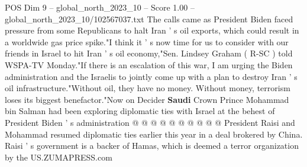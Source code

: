 \begin{textsample}{POS Dim 9 – global\_north\_2023\_10 – Score 1.00 – global\_north\_2023\_10/102567037.txt}
The calls came as President Biden faced pressure from some Republicans to halt Iran ' s oil exports, which could result in a worldwide gas price spike."I think it ' s now time for us to consider with our friends in Israel to hit Iran ' s oil economy,"Sen.
Lindsey Graham ( R-SC ) told WSPA-TV Monday."If there is an escalation of this war, I am urging the Biden administration and the Israelis to jointly come up with a plan to destroy Iran ' s oil infrastructure."Without oil, they have no money.
Without money, terrorism loses its biggest benefactor."Now on Decider \textbf{Saudi} Crown Prince Mohammad bin Salman had been exploring diplomatic ties with Israel at the behest of President Biden ' s administration @ @ @ @ @ @ @ @ @ @ President Raisi and Mohammad resumed diplomatic ties earlier this year in a deal brokered by China.
Raisi ' s government is a backer of Hamas, which is deemed a terror organization by the US.ZUMAPRESS.com

\end{textsample}
